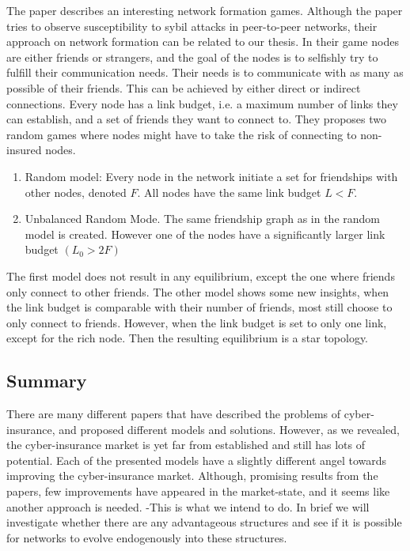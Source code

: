 The paper \cite{danezis2006network} describes an interesting network formation games. Although the paper tries to observe susceptibility to sybil attacks in peer-to-peer networks, their approach on network formation can be related to our thesis. In their game nodes are either friends or strangers, and the goal of the nodes is to selfishly try to fulfill their communication needs. Their needs is to communicate with as many as possible of their friends. This can be achieved by either direct or indirect connections. Every node has a link budget, i.e. a maximum number of links they can establish, and a set of friends they want to connect to. 
They proposes two random games where nodes might have to take the risk of connecting to non-insured nodes.
\begin{enumerate}
\item Random model: Every node in the network initiate a set for friendships with other nodes, denoted $F$. All nodes have the same link budget $L<F$. 
\item Unbalanced Random Mode. The same friendship graph as in the random model is created. However one of the nodes have a significantly larger link budget $(L_{0} > 2 F)$
\end{enumerate}
The first model does not result in any equilibrium, except the one where friends only connect to other friends.
The other model shows some new insights, when the link budget is comparable with their number of friends, most still choose to only connect to friends. However, when the link budget is set to only one link, except for the rich node. Then the resulting equilibrium is a star topology. 

\subsection{Summary}
There are many different papers that have described the problems of cyber-insurance, and proposed different models and solutions. However, as we revealed, the cyber-insurance market is yet far from established and still has lots of potential. Each of the presented models have a slightly different angel towards improving the cyber-insurance market. Although, promising results from the papers, few improvements have appeared in the market-state, and it seems like another approach is needed. -This is what we intend to do. In brief we will investigate whether there are any advantageous structures and see if it is possible for networks to evolve endogenously into these structures.  

